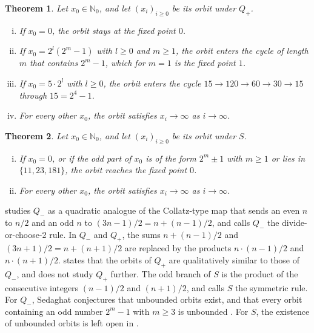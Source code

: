 \documentclass{article}
\newtheorem{theorem}{Theorem}
\newcommand{\Ge}{\geqslant}
\begin{document}
\begin{theorem}
\label{thm: plus}
    Let $x_0 \in \mathbb N_0$, and let $(x_i)_{i \Ge 0}$ be its orbit under $Q_+$.
    \begin{enumerate}[(i)]
        \setlength{\itemsep}{0pt}
        \item If $x_0 = 0$, the orbit stays at the fixed point $0$.
        \item If $x_0 = 2^l (2^m - 1)$ with $l \Ge 0$ and $m \Ge 1$, the orbit enters the cycle of length $m$ that contains $2^m - 1$, which for $m = 1$ is the fixed point $1$.
        \item If $x_0 = 5 \cdot 2^l$ with $l \Ge 0$, the orbit enters the cycle $15 \to 120 \to 60 \to 30 \to 15$ through $15 = 2^4 - 1$.
        \item For every other $x_0$, the orbit satisfies $x_i \to \infty$ as $i \to \infty$.
    \end{enumerate}
\end{theorem}

\begin{theorem}
\label{thm: S}
    Let $x_0 \in \mathbb N_0$, and let $(x_i)_{i \Ge 0}$ be its orbit under $S$.
    \begin{enumerate}[(i)]
        \setlength{\itemsep}{0pt}
        \item If $x_0 = 0$, or if the odd part of $x_0$ is of the form $2^m \pm 1$ with $m \Ge 1$ or lies in $\{11, 23, 181\}$, the orbit reaches the fixed point $0$.
        \item For every other $x_0$, the orbit satisfies $x_i \to \infty$ as $i \to \infty$.
    \end{enumerate}
\end{theorem}

\citet{sedaghat2020bounded} studies $Q_-$ as a quadratic analogue of the Collatz-type map that sends an even $n$ to $n/2$ and an odd $n$ to $(3n-1)/2 = n + (n-1)/2$, and calls $Q_-$ the divide-or-choose-2 rule. In $Q_-$ and $Q_+$, the sums $n + (n-1)/2$ and $(3n+1)/2 = n + (n+1)/2$ are replaced by the products $n \cdot (n-1)/2$ and $n \cdot (n+1)/2$. \citet[Section~1]{sedaghat2020bounded} states that the orbits of $Q_+$ are qualitatively similar to those of $Q_-$, and does not study $Q_+$ further. The odd branch of $S$ is the product of the consecutive integers $(n-1)/2$ and $(n+1)/2$, and \citet[Section~1]{sedaghat2020bounded} calls $S$ the symmetric rule. For $Q_-$, Sedaghat conjectures that unbounded orbits exist, and that every orbit containing an odd number $2^m - 1$ with $m \Ge 3$ is unbounded \citep[Conjectures~3 and~4]{sedaghat2020bounded}. For $S$, the existence of unbounded orbits is left open in \citep[Section~4]{sedaghat2020bounded}.
\end{document}
